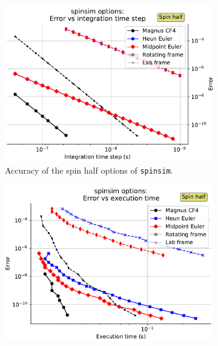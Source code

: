 \documentclass{jors}
\begin{document}

			\begin{figure}[h!]
				\begin{subfigure}[b]{0.475\textwidth}
					\includegraphics[scale=0.475]{benchmark_spin_half_step_error.pdf}
					\caption{Accuracy of the spin half options of \texttt{spinsim}.}
					\label{fig:benchmark_spin_half_step_error}
				\end{subfigure}
				\hfill
				\begin{subfigure}[b]{0.475\textwidth}
					\includegraphics[scale=0.475]{benchmark_spin_half_execution_error.pdf}

\end{subfigure}
\end{figure}
\end{document}
